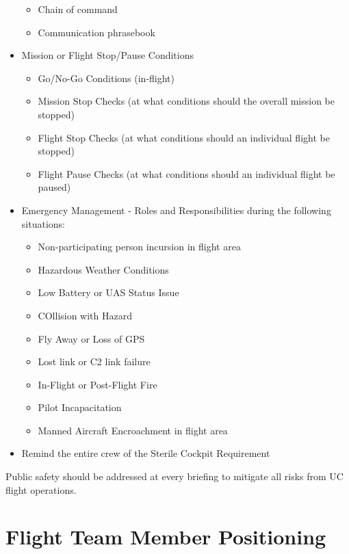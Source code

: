 \documentclass[
]{book}
\providecommand{\tightlist}{%
  \setlength{\itemsep}{0pt}\setlength{\parskip}{0pt}}
\begin{document}
\begin{itemize}
  \begin{itemize}
  \tightlist
  \item
    Chain of command
  \item
    Communication phrasebook
  \end{itemize}
\item
  Mission or Flight Stop/Pause Conditions

  \begin{itemize}
  \tightlist
  \item
    Go/No-Go Conditions (in-flight)
  \item
    Mission Stop Checks (at what conditions should the overall mission be stopped)
  \item
    Flight Stop Checks (at what conditions should an individual flight be stopped)
  \item
    Flight Pause Checks (at what conditions should an individual flight be paused)
  \end{itemize}
\item
  Emergency Management - Roles and Responsibilities during the following situations:

  \begin{itemize}
  \tightlist
  \item
    Non-participating person incursion in flight area
  \item
    Hazardous Weather Conditions
  \item
    Low Battery or UAS Status Issue
  \item
    COllision with Hazard
  \item
    Fly Away or Loss of GPS
  \item
    Lost link or C2 link failure
  \item
    In-Flight or Post-Flight Fire
  \item
    Pilot Incapacitation
  \item
    Manned Aircraft Encroachment in flight area
  \end{itemize}
\item
  Remind the entire crew of the Sterile Cockpit Requirement
\end{itemize}

Public safety should be addressed at every briefing to mitigate all risks from UC flight operations.

\hypertarget{flight-team-member-positioning}{%
\section{Flight Team Member Positioning}\label{flight-team-member-positioning}}
\end{document}
